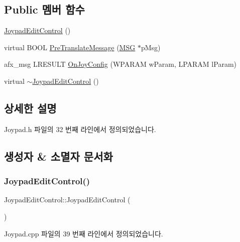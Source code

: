 \subsection*{Public 멤버 함수}
\begin{DoxyCompactItemize}
\item 
\mbox{\hyperlink{class_joypad_edit_control_a50abc954afbb31da549ffc8fdde9002f}{Joypad\+Edit\+Control}} ()
\item 
virtual B\+O\+OL \mbox{\hyperlink{class_joypad_edit_control_abeca620abd7b0118c1d044f9480bbede}{Pre\+Translate\+Message}} (\mbox{\hyperlink{prof_8cpp_a0c719c414608ef14852670b063876c07}{M\+SG}} $\ast$p\+Msg)
\item 
afx\+\_\+msg L\+R\+E\+S\+U\+LT \mbox{\hyperlink{class_joypad_edit_control_a26c5c6132fe22f6947adc741c930504e}{On\+Joy\+Config}} (W\+P\+A\+R\+AM w\+Param, L\+P\+A\+R\+AM l\+Param)
\item 
virtual \mbox{\hyperlink{class_joypad_edit_control_a1838bf21e560e0af7a5654de050f16ec}{$\sim$\+Joypad\+Edit\+Control}} ()
\end{DoxyCompactItemize}


\subsection{상세한 설명}


Joypad.\+h 파일의 32 번째 라인에서 정의되었습니다.



\subsection{생성자 \& 소멸자 문서화}
\mbox{\label{class_joypad_edit_control_a50abc954afbb31da549ffc8fdde9002f}} 
\subsubsection{\texorpdfstring{Joypad\+Edit\+Control()}{JoypadEditControl()}}
{\footnotesize\ttfamily Joypad\+Edit\+Control\+::\+Joypad\+Edit\+Control (\begin{DoxyParamCaption}{ }\end{DoxyParamCaption})}



Joypad.\+cpp 파일의 39 번째 라인에서 정의되었습니다.


